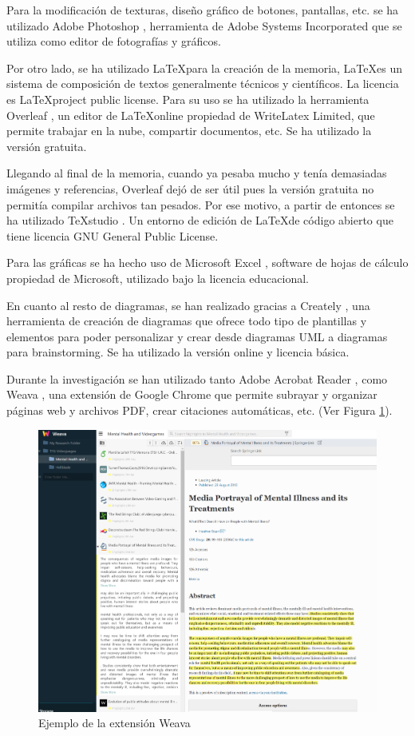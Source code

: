 \documentclass[12pt, a4paper,twoside,titlepage]{book}
\begin{document}
Para la modificación de texturas, diseño gráfico de botones, pantallas, etc. se ha utilizado Adobe Photoshop \cite{photoshop}, herramienta de Adobe Systems Incorporated que se utiliza como editor de fotografías y gráficos. 

Por otro lado, se ha utilizado \LaTeX para la creación de la memoria, \LaTeX es un sistema de composición de textos generalmente técnicos y científicos. La licencia es \LaTeX project public license. Para su uso se ha utilizado la herramienta Overleaf \cite{overleaf}, un editor de \LaTeX online propiedad de WriteLatex Limited, que permite trabajar en la nube, compartir documentos, etc. Se ha utilizado la versión gratuita. 

Llegando al final de la memoria, cuando ya pesaba mucho y tenía demasiadas imágenes y referencias, Overleaf dejó de ser útil pues la versión gratuita no permitía compilar archivos tan pesados. Por ese motivo, a partir de entonces se ha utilizado TeXstudio \cite{texstudio}. Un entorno de edición de \LaTeX de código abierto que tiene licencia GNU General Public License. 

Para las gráficas se ha hecho uso de Microsoft Excel \cite{excel}, software de hojas de cálculo propiedad de Microsoft, utilizado bajo la licencia educacional. 

En cuanto al resto de diagramas, se han realizado gracias a Creately \cite{creately}, una herramienta de creación de diagramas que ofrece todo tipo de plantillas y elementos para poder personalizar y crear desde diagramas UML a diagramas para brainstorming. Se ha utilizado la versión online y licencia básica. 

Durante la investigación se han utilizado tanto Adobe Acrobat Reader \cite{adobeacrobat}, como Weava \cite{weava}, una extensión de Google Chrome que permite subrayar y organizar páginas web y archivos PDF, crear citaciones automáticas, etc. (Ver Figura \ref{fig:weava}). 

\begin{figure}
    \centering
    \includegraphics[width=.8\linewidth]{TGF/Extra/Weava.png}
    \caption{Ejemplo de la extensión Weava}
    \label{fig:weava}
\end{figure}
\end{document}
